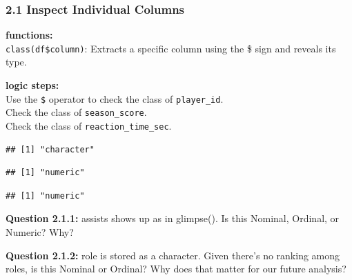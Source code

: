 \documentclass[
]{article}
\newenvironment{Shaded}{\begin{snugshade}}{\end{snugshade}}
\newcommand{\FunctionTok}[1]{\textcolor[rgb]{0.13,0.29,0.53}{\textbf{#1}}}
\newcommand{\NormalTok}[1]{#1}
\newcommand{\SpecialCharTok}[1]{\textcolor[rgb]{0.81,0.36,0.00}{\textbf{#1}}}
\begin{document}
\subsubsection{2.1 Inspect Individual
Columns}\label{inspect-individual-columns}

\textbf{functions:}\\
\texttt{class(df\$column)}: Extracts a specific column using the \$ sign
and reveals its type.

\textbf{logic steps:}\\
Use the \texttt{\$} operator to check the class of
\texttt{player\_id}.\\
Check the class of \texttt{season\_score}.\\
Check the class of \texttt{reaction\_time\_sec}.

\begin{Shaded}
\end{Shaded}

\begin{verbatim}
## [1] "character"
\end{verbatim}

\begin{Shaded}
\end{Shaded}

\begin{verbatim}
## [1] "numeric"
\end{verbatim}

\begin{Shaded}
\end{Shaded}

\begin{verbatim}
## [1] "numeric"
\end{verbatim}

\textbf{Question 2.1.1:} assists shows up as in glimpse(). Is this
Nominal, Ordinal, or Numeric? Why?

\textbf{Question 2.1.2:} role is stored as a character. Given there's no
ranking among roles, is this Nominal or Ordinal? Why does that matter
for our future analysis?
\end{document}
